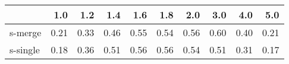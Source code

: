 \begin{tabular}{lrrrrrrrrr}
\toprule
{} &  1.0 &  1.2 &  1.4 &  1.6 &  1.8 &  2.0 &  3.0 &  4.0 &  5.0 \\
\midrule
s-merge  & 0.21 & 0.33 & 0.46 & 0.55 & 0.54 & 0.56 & 0.60 & 0.40 & 0.21 \\
s-single & 0.18 & 0.36 & 0.51 & 0.56 & 0.56 & 0.54 & 0.51 & 0.31 & 0.17 \\
\bottomrule
\end{tabular}
